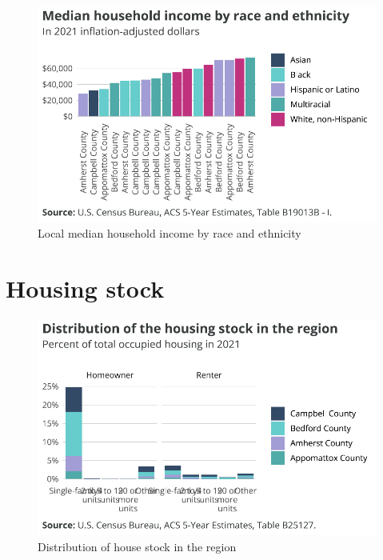 \documentclass[
  letterpaper,
  DIV=11,
  numbers=noendperiod]{scrreprt}
\begin{document}
\begin{figure}[H]

{\centering \includegraphics{./part-3-2_files/figure-pdf/fig-localrace-inc-1.pdf}

}

\caption{\label{fig-localrace-inc}Local median household income by race
and ethnicity}

\end{figure}

\hypertarget{housing-stock-1}{%
\section{Housing stock}\label{housing-stock-1}}

\begin{figure}[H]

{\centering \includegraphics{./part-3-2_files/figure-pdf/fig-localstructure-1.pdf}

}

\caption{\label{fig-localstructure}Distribution of house stock in the
region}

\end{figure}
\end{document}
